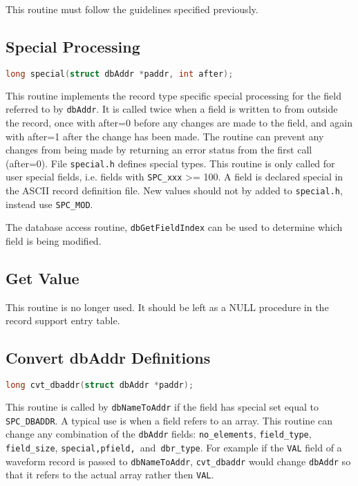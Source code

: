 This routine must follow the guidelines specified previously.

\subsection{Special Processing}

\begin{lstlisting}[language=C]
long special(struct dbAddr *paddr, int after);
\end{lstlisting}

This routine implements the record type specific special processing for the field referred to by \verb|dbAddr|.
It is called twice when a field is written to from outside the record, once with after=0 before any changes are made to the field, and again with after=1 after the change has been made.
The routine can prevent any changes from being made by returning an error status from the first call (after=0).
File \verb|special.h| defines special types.
This routine is only called for user special fields, i.e. fields with \verb|SPC_xxx| \textgreater{}= 100.
A field is declared special in the ASCII record definition file.
New values should not by added to \verb|special.h|, instead use \verb|SPC_MOD|.

The database access routine, \verb|dbGetFieldIndex| can be used to determine which field is being modified.

\subsection{Get Value}

This routine is no longer used.
It should be left as a NULL procedure in the record support entry table.

\subsection{Convert dbAddr Definitions}

\begin{lstlisting}[language=C]
long cvt_dbaddr(struct dbAddr *paddr);
\end{lstlisting}

This routine is called by \verb|dbNameToAddr| if the field has special set equal to \verb|SPC_DBADDR|.
A typical use is when a field refers to an array.
This routine can change any combination of the \verb|dbAddr| fields:
\verb|no_elements|, \verb|field_type|, \verb|field_size|, \verb|special,pfield, |and\verb| dbr_type|.
For example if the \verb|VAL| field of a waveform record is passed to \verb|dbNameToAddr|, \verb|cvt_dbaddr| would change \verb|dbAddr| so that it refers to the actual array rather then \verb|VAL|.


